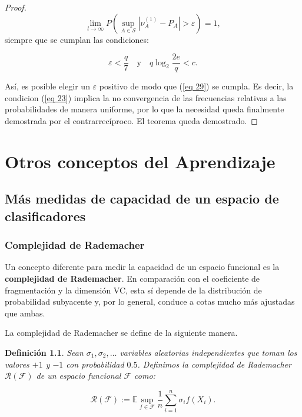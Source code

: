 \documentclass{report}
\newtheorem{dfn}{Definición}[section]
\begin{document}
\begin{proof}
\begin{equation}\label{eq 29}
\lim_{l \to \infty} P\left( \sup_{A \in \mathcal{S}} \left| \nu_A^{(1)} - P_A \right| > \varepsilon \right) = 1,
\end{equation}
siempre que se cumplan las condiciones:

\[
\varepsilon < \frac{q}{7} \quad \text{y} \quad q \log_2 \frac{2e}{q} < c.
\]

Así, es posible elegir un \( \varepsilon \) positivo de modo que (\ref{eq 29}) se cumpla. Es decir,
la condicion (\ref{eq 23}) implica la no convergencia de las frecuencias relativas a las probabilidades de manera uniforme,
por lo que la necesidad queda finalmente demostrada por el contrarrecíproco. El teorema queda demostrado.

\end{proof}





\chapter{Otros conceptos del Aprendizaje}

\section{Más medidas de capacidad de un espacio de clasificadores}
\subsection{Complejidad de Rademacher}
Un concepto diferente para medir la capacidad de un espacio funcional es la \textbf{complejidad de Rademacher}.
En comparación con el coeficiente de fragmentación y la dimensión VC, esta sí depende de la distribución de
probabilidad subyacente y, por lo general, conduce a cotas mucho más ajustadas que ambas.

La complejidad de Rademacher se define de la siguiente manera.

\begin{dfn}
Sean \(\sigma_1, \sigma_2, \dots\) variables aleatorias independientes que toman los valores \(+1\) y \(-1\)
con probabilidad \(0.5\). Definimos la complejidad de Rademacher \(\mathscr{R}(\mathcal{F})\) de un espacio funcional
\(\mathcal{F}\) como:

\[
    \mathscr{R}(\mathcal{F}) := \mathbb{E} \sup_{f \in \mathcal{F}} \frac{1}{n} \sum_{i=1}^{n} \sigma_i f(X_i).
\]
\end{dfn}
\end{document}
